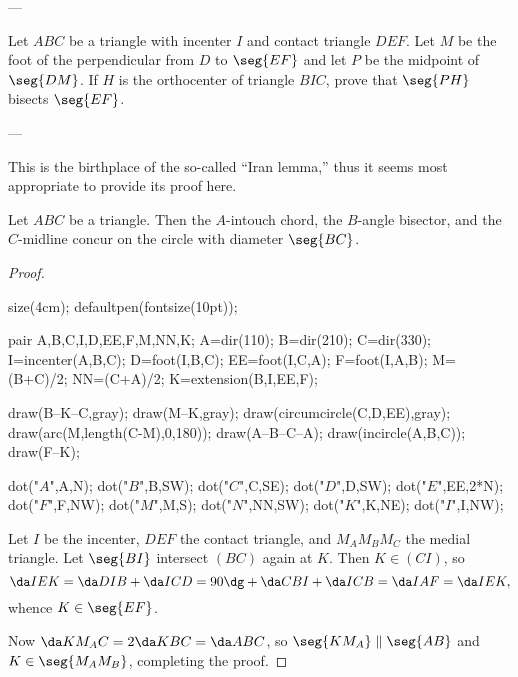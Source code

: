 
---

Let $ABC$ be a triangle with incenter $I$ and contact triangle $DEF$. Let $M$ be the foot of the perpendicular from $D$ to $\seg{EF}$ and let $P$ be the midpoint of $\seg{DM}$. If $H$ is the orthocenter of triangle $BIC$, prove that $\seg{PH}$ bisects $\seg{EF}$.

---

This is the birthplace of the so-called ``Iran lemma,'' thus it seems most appropriate to provide its proof here.
\begin{boxlemma*}
    Let $ABC$ be a triangle. Then the $A$-intouch chord, the $B$-angle bisector, and the $C$-midline concur on the circle with diameter $\seg{BC}$.
\end{boxlemma*}
\begin{proof}\ 
    \begin{center}
        \begin{asy}
            size(4cm); defaultpen(fontsize(10pt));

            pair A,B,C,I,D,EE,F,M,NN,K;
            A=dir(110);
            B=dir(210);
            C=dir(330);
            I=incenter(A,B,C);
            D=foot(I,B,C);
            EE=foot(I,C,A);
            F=foot(I,A,B);
            M=(B+C)/2;
            NN=(C+A)/2;
            K=extension(B,I,EE,F);

            draw(B--K--C,gray);
            draw(M--K,gray);
            draw(circumcircle(C,D,EE),gray);
            draw(arc(M,length(C-M),0,180));
            draw(A--B--C--A);
            draw(incircle(A,B,C));
            draw(F--K);

            dot("$A$",A,N);
            dot("$B$",B,SW);
            dot("$C$",C,SE);
            dot("$D$",D,SW);
            dot("$E$",EE,2*N);
            dot("$F$",F,NW);
            dot("$M$",M,S);
            dot("$N$",NN,SW);
            dot("$K$",K,NE);
            dot("$I$",I,NW);
        \end{asy}
    \end{center}
    Let $I$ be the incenter, $DEF$ the contact triangle, and $M_AM_BM_C$ the medial triangle. Let $\seg{BI}$ intersect $(BC)$ again at $K$. Then $K\in(CI)$, so \[\da IEK=\da DIB+\da ICD=90\dg+\da CBI+\da ICB=\da IAF=\da IEK,\]
    whence $K\in\seg{EF}$.

    Now $\da KM_AC=2\da KBC=\da ABC$, so $\seg{KM_A}\parallel\seg{AB}$ and $K\in\seg{M_AM_B}$, completing the proof.
\end{proof}
